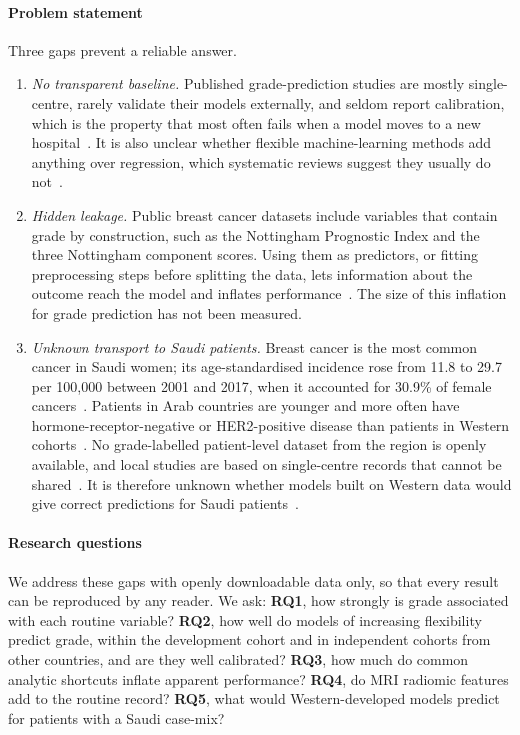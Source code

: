 \paragraph{Problem statement}
Three gaps prevent a reliable answer.
\begin{enumerate}[leftmargin=*,itemsep=1pt,topsep=2pt]
\item \emph{No transparent baseline.} Published grade-prediction studies are mostly single-centre,
rarely validate their models externally, and seldom report calibration, which is the property that
most often fails when a model moves to a new hospital~\citep{vancalster2019calibration,riley2024evalpart2}.
It is also unclear whether flexible machine-learning methods add anything over regression, which
systematic reviews suggest they usually do not~\citep{christodoulou2019lr}.
\item \emph{Hidden leakage.} Public breast cancer datasets include variables that contain grade by
construction, such as the Nottingham Prognostic Index and the three Nottingham component scores.
Using them as predictors, or fitting preprocessing steps before splitting the data, lets information
about the outcome reach the model and inflates performance~\citep{kapoor2023leakage,varoquaux2022failures,rosenblatt2024leakage}.
The size of this inflation for grade prediction has not been measured.
\item \emph{Unknown transport to Saudi patients.} Breast cancer is the most common cancer in Saudi
women; its age-standardised incidence rose from 11.8 to 29.7 per 100{,}000 between 2001 and 2017,
when it accounted for 30.9\% of female cancers~\citep{basudan2022registry}. Patients in Arab
countries are younger and more often have hormone-receptor-negative or HER2-positive
disease than patients in Western cohorts~\citep{najjar2010arab,chouchane2013arab,elkum2007young,altamimi2010saudi}.
No grade-labelled patient-level dataset from the region is openly available, and local studies are
based on single-centre records that cannot be
shared~\citep{kussaibi2021saudi,durrani2025healthcare}. It is therefore unknown whether models built
on Western data would give correct predictions for Saudi patients~\citep{debray2015framework,steingrimsson2023transport}.
\end{enumerate}

\paragraph{Research questions}
We address these gaps with openly downloadable data only, so that every result can be reproduced by
any reader. We ask:
\textbf{RQ1}, how strongly is grade associated with each routine variable?
\textbf{RQ2}, how well do models of increasing flexibility predict grade, within the development
cohort and in independent cohorts from other countries, and are they well calibrated?
\textbf{RQ3}, how much do common analytic shortcuts inflate apparent performance?
\textbf{RQ4}, do MRI radiomic features add to the routine record?
\textbf{RQ5}, what would Western-developed models predict for patients with a Saudi case-mix?


